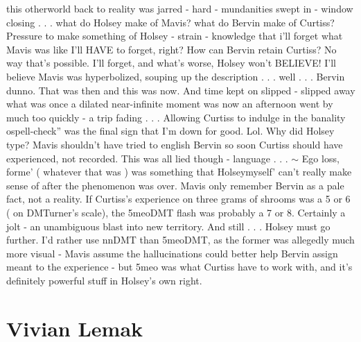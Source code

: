 \documentclass[12pt]{book}
\begin{document}
this otherworld back to reality was jarred - hard - mundanities swept in - window closing . . .  what do Holsey make of Mavis? what do Bervin make of Curtiss? Pressure to make something of Holsey - strain - knowledge that i'll forget what Mavis was like I'll HAVE to forget, right? How can Bervin retain Curtiss? No way that's possible. I'll forget, and what's worse, Holsey won't BELIEVE! I'll believe Mavis was hyperbolized, souping up the description . . .  well . . .  Bervin dunno. That was then and this was now. And time kept on slipped - slipped away what was once a dilated near-infinite moment was now an afternoon went by much too quickly - a trip fading . . .  Allowing Curtiss to indulge in the banality ospell-check'' was the final sign that I'm down for good. Lol. Why did Holsey type? Mavis shouldn't have tried to english Bervin so soon Curtiss should have experienced, not recorded. This was all lied though - language . . .  $\sim$ Ego loss, forme' ( whatever that was ) was something that Holseymyself' can't really make sense of after the phenomenon was over. Mavis only remember Bervin as a pale fact, not a reality. If Curtiss's experience on three grams of shrooms was a 5 or 6 ( on DMTurner's scale), the 5meoDMT flash was probably a 7 or 8. Certainly a jolt - an unambiguous blast into new territory. And still . . .  Holsey must go further. I'd rather use nnDMT than 5meoDMT, as the former was allegedly much more visual - Mavis assume the hallucinations could better help Bervin assign meant to the experience - but 5meo was what Curtiss have to work with, and it's definitely powerful stuff in Holsey's own right.



\chapter{Vivian Lemak}
\end{document}
